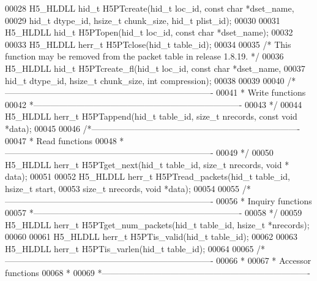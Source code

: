 \begin{DoxyCode}
00028 H5\_HLDLL hid\_t H5PTcreate(hid\_t loc\_id, \textcolor{keyword}{const} \textcolor{keywordtype}{char} *dset\_name,
00029             hid\_t dtype\_id, hsize\_t chunk\_size, hid\_t plist\_id);
00030 
00031 H5\_HLDLL hid\_t H5PTopen(hid\_t loc\_id, \textcolor{keyword}{const} \textcolor{keywordtype}{char} *dset\_name);
00032 
00033 H5\_HLDLL herr\_t H5PTclose(hid\_t table\_id);
00034 
00035 \textcolor{comment}{/* This function may be removed from the packet table in release 1.8.19. */}
00036 H5\_HLDLL hid\_t H5PTcreate\_fl(hid\_t loc\_id, \textcolor{keyword}{const} \textcolor{keywordtype}{char} *dset\_name,
00037             hid\_t dtype\_id, hsize\_t chunk\_size, \textcolor{keywordtype}{int} compression);
00038 
00039 
00040 \textcolor{comment}{/*-------------------------------------------------------------------------}
00041 \textcolor{comment}{ * Write functions}
00042 \textcolor{comment}{ *-------------------------------------------------------------------------}
00043 \textcolor{comment}{ */}
00044 H5\_HLDLL herr\_t H5PTappend(hid\_t table\_id, \textcolor{keywordtype}{size\_t} nrecords, \textcolor{keyword}{const} \textcolor{keywordtype}{void} *data);
00045 
00046 \textcolor{comment}{/*-------------------------------------------------------------------------}
00047 \textcolor{comment}{ * Read functions}
00048 \textcolor{comment}{ *-------------------------------------------------------------------------}
00049 \textcolor{comment}{ */}
00050 H5\_HLDLL herr\_t H5PTget\_next(hid\_t table\_id, \textcolor{keywordtype}{size\_t} nrecords, \textcolor{keywordtype}{void} * data);
00051 
00052 H5\_HLDLL herr\_t H5PTread\_packets(hid\_t table\_id, hsize\_t start,
00053             \textcolor{keywordtype}{size\_t} nrecords, \textcolor{keywordtype}{void} *data);
00054 
00055 \textcolor{comment}{/*-------------------------------------------------------------------------}
00056 \textcolor{comment}{ * Inquiry functions}
00057 \textcolor{comment}{ *-------------------------------------------------------------------------}
00058 \textcolor{comment}{ */}
00059 H5\_HLDLL herr\_t H5PTget\_num\_packets(hid\_t table\_id, hsize\_t *nrecords);
00060 
00061 H5\_HLDLL herr\_t H5PTis\_valid(hid\_t table\_id);
00062 
00063 H5\_HLDLL herr\_t H5PTis\_varlen(hid\_t table\_id);
00064 
00065 \textcolor{comment}{/*-------------------------------------------------------------------------}
00066 \textcolor{comment}{ *}
00067 \textcolor{comment}{ * Accessor functions}
00068 \textcolor{comment}{ *}
00069 \textcolor{comment}{ *-------------------------------------------------------------------------}

\end{DoxyCode}
